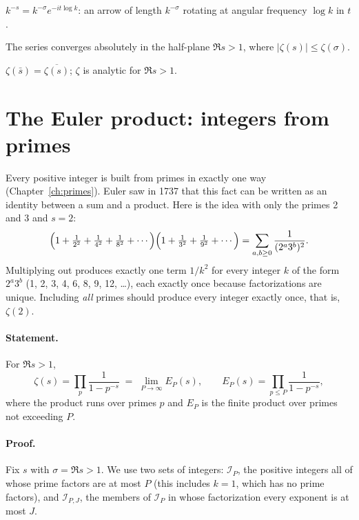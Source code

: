 \begin{keyideas}
\item $k^{-s}=k^{-\sigma}e^{-it\log k}$: an arrow of length $k^{-\sigma}$ rotating at angular frequency $\log k$ in $t$.
\item The series converges absolutely in the half-plane $\Re s>1$, where $|\zeta(s)|\le\zeta(\sigma)$.
\item $\zeta(\bar s)=\overline{\zeta(s)}$; $\zeta$ is analytic for $\Re s>1$.
\end{keyideas}

\section{The Euler product: integers from primes}\label{sec:zeta-euler}

Every positive integer is built from primes in exactly one way (Chapter~\ref{ch:primes}). Euler saw in 1737 that this fact can be written as an identity between a sum and a product. Here is the idea with only the primes 2 and 3 and $s=2$:
\[
\Bigl(1+\tfrac1{2^2}+\tfrac1{4^2}+\tfrac1{8^2}+\cdots\Bigr)\Bigl(1+\tfrac1{3^2}+\tfrac1{9^2}+\cdots\Bigr)
=\sum_{a,b\ge0}\frac{1}{(2^a3^b)^2}.
\]
Multiplying out produces exactly one term $1/k^2$ for every integer $k$ of the form $2^a3^b$ (1, 2, 3, 4, 6, 8, 9, 12, \dots), each exactly once because factorizations are unique. Including \emph{all} primes should produce every integer exactly once, that is, $\zeta(2)$.

\paragraph{Statement.} For $\Re s>1$,
\begin{equation}
\zeta(s)=\prod_{p}\frac{1}{1-p^{-s}}\;=\;\lim_{P\to\infty}E_P(s),\qquad
E_P(s)=\prod_{p\le P}\frac{1}{1-p^{-s}},
\label{eq:zeta-euler}
\end{equation}
where the product runs over primes $p$ and $E_P$ is the finite product over primes not exceeding $P$.

\paragraph{Proof.} Fix $s$ with $\sigma=\Re s>1$. We use two sets of integers: $\mathcal{I}_P$, the positive integers all of whose prime factors are at most $P$ (this includes $k=1$, which has no prime factors), and $\mathcal{I}_{P,J}$, the members of $\mathcal{I}_P$ in whose factorization every exponent is at most $J$.


